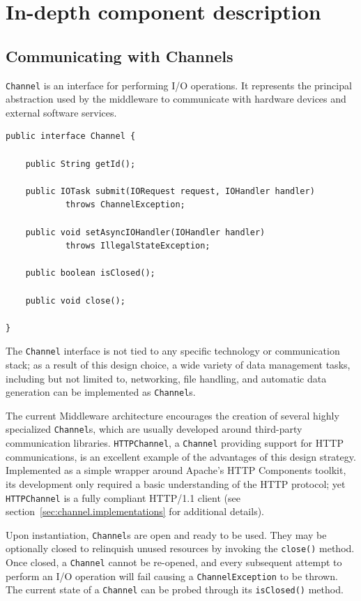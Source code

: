 \chapter{In-depth component description}

\section{Communicating with Channels}
\label{sec:channel}

\texttt{Channel} is an interface for performing I/O operations. It represents
the principal abstraction used by the middleware to communicate with hardware
devices and external software services.

\lstset{language=Java}
\begin{lstlisting}[float,caption=The Channel interface,label={lst:channel}]
public interface Channel {

	public String getId();
	
	public IOTask submit(IORequest request, IOHandler handler)
			throws ChannelException;
	
	public void setAsyncIOHandler(IOHandler handler)
			throws IllegalStateException;
			
	public boolean isClosed();
	
	public void close();
			
}
\end{lstlisting}

The \texttt{Channel} interface is not tied to any specific technology or
communication stack; as a result of this design choice, a wide variety of data
management tasks, including but not limited to, networking, file handling, and
automatic data generation can be implemented as \texttt{Channel}s.

The current Middleware architecture encourages the creation of several highly
specialized \texttt{Channel}s, which are usually developed around third-party
communication libraries. \texttt{HTTPChannel}, a \texttt{Channel} providing
support for HTTP communications, is an excellent example of the advantages of
this design strategy. Implemented as a simple wrapper around Apache's HTTP
Components toolkit, its development only required a basic understanding of the
HTTP protocol; yet \texttt{HTTPChannel} is a fully compliant HTTP/1.1 client
(see section~\ref{sec:channel.implementations} for additional details).

Upon instantiation, \texttt{Channel}s are open and ready to be used. They may
be optionally closed to relinquish unused resources by invoking the
\texttt{close()} method. Once closed, a \texttt{Channel} cannot be re-opened,
and every subsequent attempt to perform an I/O operation will fail causing a
\texttt{ChannelException} to be thrown. The current state of a \texttt{Channel}
can be probed through its \texttt{isClosed()} method.


